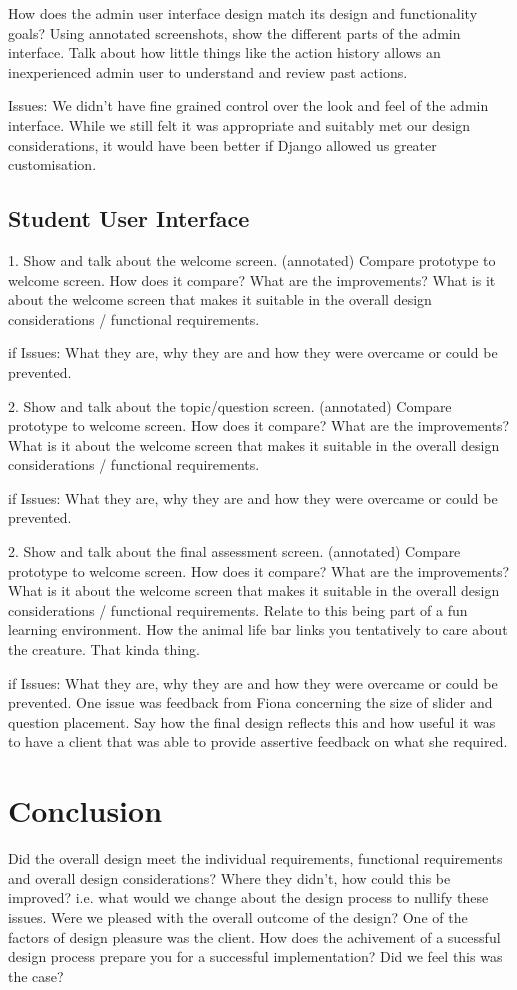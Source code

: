 \documentclass{l3proj}
\begin{document}
How does the admin user interface design match its design and functionality goals?
Using annotated screenshots, show the different parts of the admin interface.
Talk about how little things like the action history allows an inexperienced admin user to understand and review past actions.

Issues: We didn't have fine grained control over the look and feel of the admin interface. While we still felt it was appropriate and suitably met our design considerations, it would have been better if Django allowed us greater customisation.

\subsection{Student User Interface}

1. Show and talk about the welcome screen. (annotated)
Compare prototype to welcome screen. How does it compare? What are the improvements? What is it about the welcome screen that makes it suitable in the overall design considerations / functional requirements.

if Issues: What they are, why they are and how they were overcame or could be prevented.

2. Show and talk about the topic/question screen. (annotated)
Compare prototype to welcome screen. How does it compare? What are the improvements? What is it about the welcome screen that makes it suitable in the overall design considerations / functional requirements.

if Issues: What they are, why they are and how they were overcame or could be prevented.

2. Show and talk about the final assessment screen. (annotated)
Compare prototype to welcome screen. How does it compare? What are the improvements? What is it about the welcome screen that makes it suitable in the overall design considerations / functional requirements. Relate to this being part of a fun learning environment. How the animal life bar links you tentatively to care about the creature. That kinda thing.

if Issues: What they are, why they are and how they were overcame or could be prevented.
One issue was feedback from Fiona concerning the size of slider and question placement. Say how the final design reflects this and how useful it was to have a client that was able to provide assertive feedback on what she required. 

\section{Conclusion}

Did the overall design meet the individual requirements, functional requirements and overall design considerations?
Where they didn't, how could this be improved? i.e. what would we change about the design process to nullify these issues.
Were we pleased with the overall outcome of the design?
One of the factors of design pleasure was the client.
How does the achivement of a sucessful design process prepare you for a successful implementation?
Did we feel this was the case?
\end{document}
